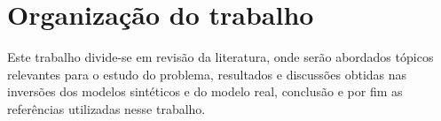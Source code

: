 
\section{Organização do trabalho}
\label{subsec:organizacao-do-trabalho}

Este trabalho divide-se em revisão da literatura, onde serão abordados tópicos relevantes para o estudo do problema, resultados e discussões obtidas nas inversões dos modelos sintéticos e do modelo real, conclusão e por fim as referências utilizadas nesse trabalho.